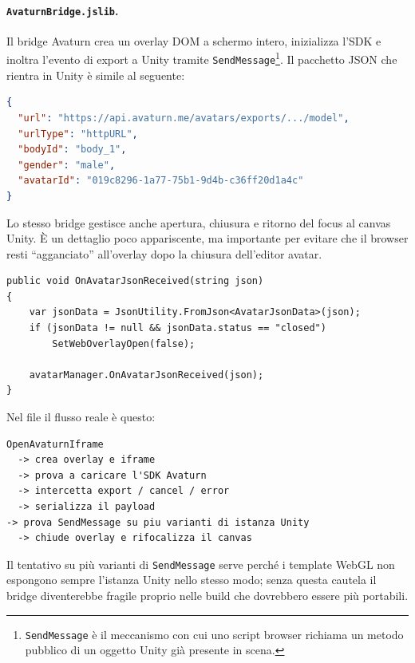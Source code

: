 \paragraph{\normalfont\texttt{AvaturnBridge.jslib}.}
Il bridge Avaturn crea un overlay DOM a schermo intero, inizializza l'SDK e inoltra l'evento di export a Unity tramite \texttt{SendMessage}\footnote{\texttt{SendMessage} è il meccanismo con cui uno script browser richiama un metodo pubblico di un oggetto Unity già presente in scena.}. Il pacchetto JSON che rientra in Unity è simile al seguente:

\begin{lstlisting}[language=json,caption={Payload di export inoltrato dal bridge Avaturn al client Unity.}]
{
  "url": "https://api.avaturn.me/avatars/exports/.../model",
  "urlType": "httpURL",
  "bodyId": "body_1",
  "gender": "male",
  "avatarId": "019c8296-1a77-75b1-9d4b-c36ff20d1a4c"
}
\end{lstlisting}

Lo stesso bridge gestisce anche apertura, chiusura e ritorno del focus al canvas Unity. È un dettaglio poco appariscente, ma importante per evitare che il browser resti ``agganciato'' all'overlay dopo la chiusura dell'editor avatar.

\begin{lstlisting}[style=sfcode,language={[Sharp]C},caption={Estratto adattato del callback che rientra in Unity dopo l'export Avaturn.}]
public void OnAvatarJsonReceived(string json)
{
    var jsonData = JsonUtility.FromJson<AvatarJsonData>(json);
    if (jsonData != null && jsonData.status == "closed")
        SetWebOverlayOpen(false);

    avatarManager.OnAvatarJsonReceived(json);
}
\end{lstlisting}

Nel file il flusso reale è questo:

\begin{lstlisting}[basicstyle=\ttfamily\small,breaklines=true]
OpenAvaturnIframe
  -> crea overlay e iframe
  -> prova a caricare l'SDK Avaturn
  -> intercetta export / cancel / error
  -> serializza il payload
-> prova SendMessage su piu varianti di istanza Unity
  -> chiude overlay e rifocalizza il canvas
\end{lstlisting}

Il tentativo su più varianti di \texttt{SendMessage} serve perché i template WebGL non espongono sempre l'istanza Unity nello stesso modo; senza questa cautela il bridge diventerebbe fragile proprio nelle build che dovrebbero essere più portabili.

